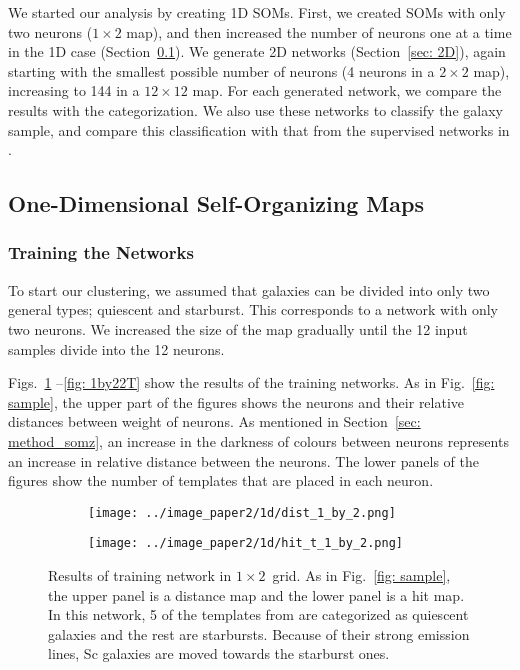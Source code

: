     We started our analysis by creating 1D SOMs. 
    First, we created SOMs with only two neurons ($1\times2$ map), and then increased the number of neurons one at a time in the 1D case (Section~\ref{sec: 1D_somz}).
    We generate 2D networks (Section~\ref{sec: 2D}),  again starting with the smallest possible number of neurons (4 neurons in a $2\times2$ map), increasing to 144 in a $12\times12$ map.    
    For each generated network, we compare the results with the  categorization.
    We also use these networks to classify the  galaxy sample, and compare this classification with that from the supervised networks in .

    \subsection{One-Dimensional Self-Organizing Maps}
    \label{sec: 1D_somz}
        \subsubsection{Training the Networks}
        \label{sec: 1Dt}
            To start our clustering, we assumed that galaxies can be divided into only two general types; quiescent and starburst.
            This corresponds to a network with only two neurons.
            We increased the size of the map gradually until the 12 input samples divide into the 12 neurons. 
        
            Figs.~\ref{fig: 1by2T} --\ref{fig: 1by22T} show the results of the training networks.
            As in Fig.~\ref{fig: sample}, the upper part of the figures shows the neurons and their relative distances between weight of neurons.
            As mentioned in Section~\ref{sec: method_somz}, an increase in the darkness of colours between neurons represents an increase in relative distance between the neurons.
            The lower panels of the figures show the number of  templates that are placed in each neuron. 
            \begin{figure}
                \begin{subfigure}[b]{\textwidth}
                    \centering
                  \texttt{[image: ../image\_paper2/1d/dist\_1\_by\_2.png]}
                \end{subfigure}
                \hfill
                \begin{subfigure}[b]{\textwidth}
                    \centering \texttt{[image: ../image\_paper2/1d/hit\_t\_1\_by\_2.png]}
                \end{subfigure}
                \caption[Results of training network in $1\times2$~grid]{Results of training network in $1\times2$~grid. As in Fig.~\ref{fig: sample}, the upper panel is a distance map and the lower panel is a hit map. In this network, 5 of the templates from \citet{Kinney96} are categorized as quiescent galaxies and the rest are starbursts. Because of their strong emission lines, Sc galaxies are moved towards the starburst ones.}
                 \label{fig: 1by2T}
            \end{figure}
        
